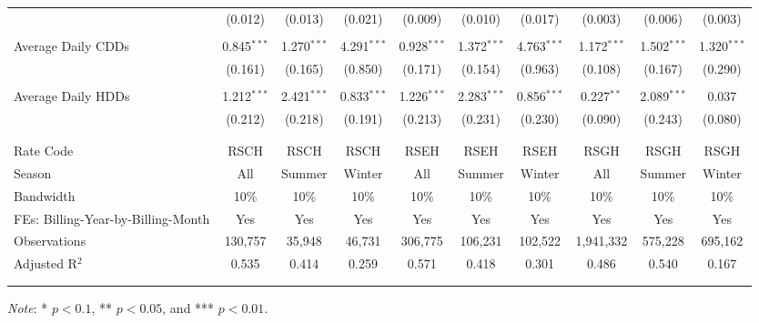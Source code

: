 {\begin{table}[t!]
\begin{adjustbox}{scale = 0.77}
\begin{threeparttable}
\begin{tabular}{@{\extracolsep{3pt}}lccccccccc}
                    & (0.012) & (0.013) & (0.021) & (0.009) & (0.010) & (0.017) & (0.003) & (0.006) & (0.003) \\ 
                    & & & & & & & & & \\ 
                    Average Daily CDDs & 0.845$^{***}$ & 1.270$^{***}$ & 4.291$^{***}$ & 0.928$^{***}$ & 1.372$^{***}$ & 4.763$^{***}$ & 1.172$^{***}$ & 1.502$^{***}$ & 1.320$^{***}$ \\ 
                    & (0.161) & (0.165) & (0.850) & (0.171) & (0.154) & (0.963) & (0.108) & (0.167) & (0.290) \\ 
                    & & & & & & & & & \\ 
                    Average Daily HDDs & 1.212$^{***}$ & 2.421$^{***}$ & 0.833$^{***}$ & 1.226$^{***}$ & 2.283$^{***}$ & 0.856$^{***}$ & 0.227$^{**}$ & 2.089$^{***}$ & 0.037 \\ 
                    & (0.212) & (0.218) & (0.191) & (0.213) & (0.231) & (0.230) & (0.090) & (0.243) & (0.080) \\ 
                    & & & & & & & & & \\
                    \hline
                    \\[-2.0ex]
                    Rate Code & RSCH & RSCH & RSCH & RSEH & RSEH & RSEH & RSGH & RSGH & RSGH \\ 
                    Season & All & Summer & Winter & All & Summer & Winter & All & Summer & Winter \\ 
                    Bandwidth & 10\% & 10\% & 10\% & 10\% & 10\% & 10\% & 10\% & 10\% & 10\% \\ 
                    FEs: Billing-Year-by-Billing-Month & Yes & Yes & Yes & Yes & Yes & Yes & Yes & Yes & Yes \\ 
                    Observations & 130,757 & 35,948 & 46,731 & 306,775 & 106,231 & 102,522 & 1,941,332 & 575,228 & 695,162 \\ 
                    Adjusted R$^{2}$ & 0.535 & 0.414 & 0.259 & 0.571 & 0.418 & 0.301 & 0.486 & 0.540 & 0.167 \\
                    \\[-2.0ex]
                    \hline \hline
                    \\[-4.5ex]
                \end{tabular}
                \begin{tablenotes}[flushleft]
                    \footnotesize
                    \item \textit{Note}: * $p < 0.1$, ** $p < 0.05$, and *** $p < 0.01$.
                \end{tablenotes}
            \end{threeparttable}
        \end{adjustbox}
    \end{table}
}
